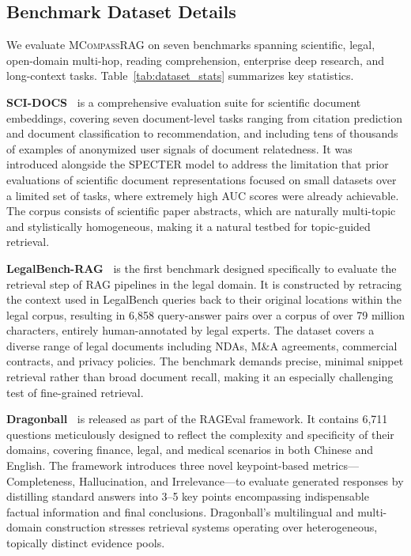 \documentclass{llmxive}
\providecommand{\name}[1]{\textsc{MCompassRAG}\xspace}
\begin{document}
\subsection{Benchmark Dataset Details}
\label{app:benchmarks}

We evaluate \name{} on seven benchmarks spanning scientific, legal, open-domain multi-hop, reading comprehension, enterprise deep research, and long-context tasks. Table~\ref{tab:dataset_stats} summarizes key statistics.

\noindent
\textbf{SCI-DOCS~\cite{cohan-etal-2020-specter}} is a comprehensive evaluation suite for scientific document embeddings, covering seven document-level tasks ranging from citation prediction and document classification to recommendation, and including tens of thousands of examples of anonymized user signals of document relatedness.  It was introduced alongside the SPECTER model to address the limitation that prior evaluations of scientific document representations focused on small datasets over a limited set of tasks, where extremely high AUC scores were already achievable.  The corpus consists of scientific paper abstracts, which are naturally multi-topic and stylistically homogeneous, making it a natural testbed for topic-guided retrieval.

\noindent
\textbf{LegalBench-RAG~\cite{pipitone2024legalbenchragbenchmarkretrievalaugmentedgeneration}} is the first benchmark designed specifically to evaluate the retrieval step of RAG pipelines in the legal domain. It is constructed by retracing the context used in LegalBench queries back to their original locations within the legal corpus, resulting in 6,858 query-answer pairs over a corpus of over 79 million characters, entirely human-annotated by legal experts.  The dataset covers a diverse range of legal documents including NDAs, M\&A agreements, commercial contracts, and privacy policies.  The benchmark demands precise, minimal snippet retrieval rather than broad document recall, making it an especially challenging test of fine-grained retrieval.

\noindent
\textbf{Dragonball~\cite{zhu-etal-2025-rageval}} is released as part of the RAGEval framework. It contains 6,711 questions meticulously designed to reflect the complexity and specificity of their domains, covering finance, legal, and medical scenarios in both Chinese and English.  The framework introduces three novel keypoint-based metrics—Completeness, Hallucination, and Irrelevance—to evaluate generated responses by distilling standard answers into 3–5 key points encompassing indispensable factual information and final conclusions.  Dragonball's multilingual and multi-domain construction stresses retrieval systems operating over heterogeneous, topically distinct evidence pools.
\end{document}

